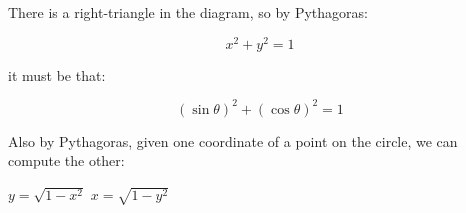 There is a right-triangle in the diagram, so by Pythagoras:

$$
x^2 + y^2 = 1
$$

it must be that:

$$
(\sin \theta)^2 + (\cos \theta)^2 = 1
$$

Also by Pythagoras, given one coordinate of a point on the circle, we can compute the other:

\begin{center}
    $y = \sqrt{1 - x^2}$ \quad $x = \sqrt{1 - y^2}$    
\end{center}
